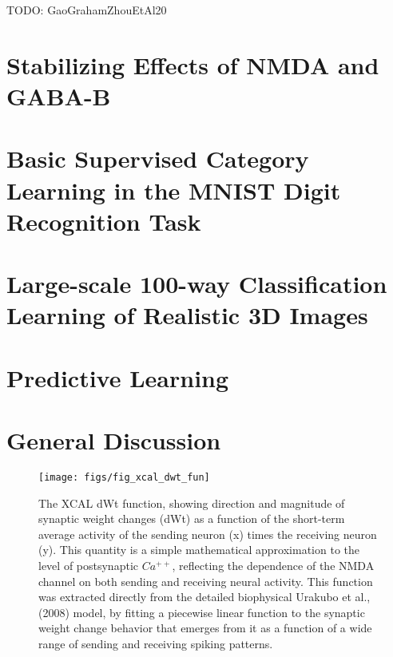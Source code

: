 \documentclass[11pt,twoside]{article}
\newif\myifpdf
\begin{document}
TODO: GaoGrahamZhouEtAl20

\section{Stabilizing Effects of NMDA and GABA-B}

\section{Basic Supervised Category Learning in the MNIST Digit Recognition Task}

\section{Large-scale 100-way Classification Learning of Realistic 3D Images}

\section{Predictive Learning}

\section{General Discussion}

\begin{figure}
  \centering\texttt{[image: figs/fig\_xcal\_dwt\_fun]}
  \caption{\footnotesize The XCAL dWt function, showing direction and magnitude of synaptic weight changes (dWt) as a function of the short-term average activity of the sending neuron (x) times the receiving neuron (y). This quantity is a simple mathematical approximation to the level of postsynaptic $Ca^{++}$, reflecting the dependence of the NMDA channel on both sending and receiving neural activity. This function was extracted directly from the detailed biophysical Urakubo et al., (2008) model, by fitting a piecewise linear function to the synaptic weight change behavior that emerges from it as a function of a wide range of sending and receiving spiking patterns.}
  \label{fig.xcal}
\end{figure}




\end{document}
